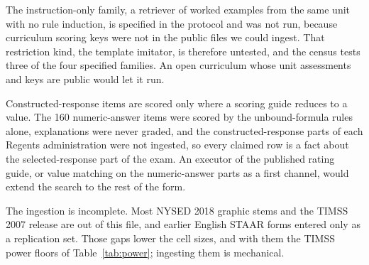 The instruction-only family, a retriever of worked examples from the same unit with no rule induction, is specified in the protocol and was not run, because curriculum scoring keys were not in the public files we could ingest. That restriction kind, the template imitator, is therefore untested, and the census tests three of the four specified families. An open curriculum whose unit assessments and keys are public would let it run.

Constructed-response items are scored only where a scoring guide reduces to a value. The 160 numeric-answer items were scored by the unbound-formula rules alone, explanations were never graded, and the constructed-response parts of each Regents administration were not ingested, so every claimed row is a fact about the selected-response part of the exam. An executor of the published rating guide, or value matching on the numeric-answer parts as a first channel, would extend the search to the rest of the form.

The ingestion is incomplete. Most NYSED 2018 graphic stems and the TIMSS 2007 release are out of this file, and earlier English STAAR forms entered only as a replication set. Those gaps lower the cell sizes, and with them the TIMSS power floors of Table~\ref{tab:power}; ingesting them is mechanical.
